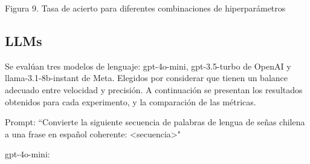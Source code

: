 \documentclass[10pt]{article}
\begin{document}
\vspace{1\baselineskip}
\begin{center}
Figura 9. Tasa de acierto para diferentes combinaciones de hiperparámetros
\end{center}

\vspace{3\baselineskip}

\subsection{LLMs}

Se evalúan tres modelos de lenguaje: gpt-4o-mini, gpt-3.5-turbo de OpenAI y llama-3.1-8b-instant de Meta. Elegidos por considerar que tienen un balance adecuado entre velocidad y precisión. A continuación se presentan los resultados obtenidos para cada experimento, y la comparación de las métricas.

Prompt: ``Convierte la siguiente secuencia de palabras de lengua de señas chilena a una frase en español coherente: <secuencia>"

\vspace{1\baselineskip}

\newpage

gpt-4o-mini:
\end{document}
